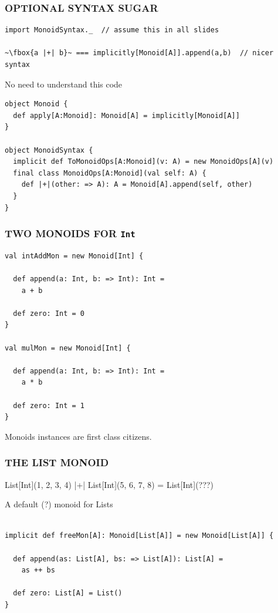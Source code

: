 \documentclass{beamer}
\begin{document}
\begin{frame}[fragile]\frametitle{OPTIONAL SYNTAX SUGAR}
  \begin{block}{}
  \begin{lstlisting}
import MonoidSyntax._  // assume this in all slides

~\fbox{a |+| b}~ === implicitly[Monoid[A]].append(a,b)  // nicer syntax
  \end{lstlisting}
  \end{block}

  \begin{block}{No need to understand this code}
  \begin{lstlisting}
object Monoid {
  def apply[A:Monoid]: Monoid[A] = implicitly[Monoid[A]]
}

object MonoidSyntax {
  implicit def ToMonoidOps[A:Monoid](v: A) = new MonoidOps[A](v)
  final class MonoidOps[A:Monoid](val self: A) {
    def |+|(other: => A): A = Monoid[A].append(self, other)
  }
}
  \end{lstlisting}
  \end{block}
\end{frame}

\begin{frame}[fragile]\frametitle{TWO MONOIDS FOR \texttt{Int}}
  \begin{block}{}
  \begin{lstlisting}
val intAddMon = new Monoid[Int] {

  def append(a: Int, b: => Int): Int =
    a + b

  def zero: Int = 0
}

val mulMon = new Monoid[Int] {

  def append(a: Int, b: => Int): Int =
    a * b

  def zero: Int = 1
}
  \end{lstlisting}
  \end{block}
  Monoids \alert{instances} are first class citizens.
\end{frame}

\begin{frame}[fragile]\frametitle{THE LIST MONOID}
  \begin{block}{}
    List[Int](1, 2, 3, 4) |+| List[Int](5, 6, 7, 8) = List[Int](???)
  \end{block}

  \pause

  \begin{block}{A default (?) monoid for Lists}
  \begin{lstlisting}

implicit def freeMon[A]: Monoid[List[A]] = new Monoid[List[A]] {

  def append(as: List[A], bs: => List[A]): List[A] =
    as ++ bs

  def zero: List[A] = List()
}
  \end{lstlisting}
  \end{block}
\end{frame}
\end{document}
